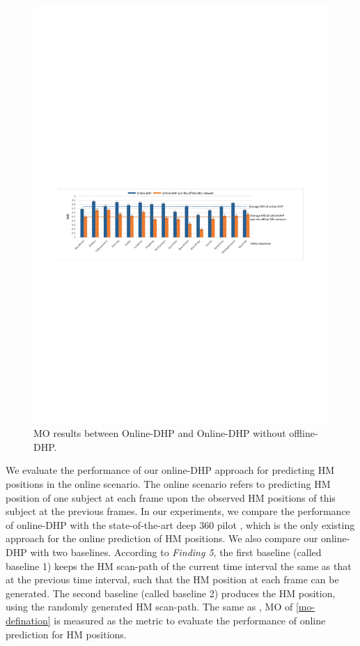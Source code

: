 \documentclass[10pt,journal,compsoc]{IEEEtran}
\begin{document}
\begin{figure}
	\begin{center}
		\centerline{\includegraphics[width=2\columnwidth]{figures/experiment_on_line/Mean_MO}}%
		\caption{\footnotesize{MO results between Online-DHP and Online-DHP without offline-DHP.}}
		\label{Online_compare}
	\end{center}
\end{figure}

We evaluate the performance of our online-DHP approach for predicting HM positions in the online scenario.
The online scenario refers to predicting HM position of one subject at each frame upon the observed HM positions of this subject at the previous frames.
In our experiments, we compare the performance of online-DHP with the state-of-the-art deep 360 pilot \cite{hu2017deep}, which is the only existing approach for the online prediction of HM positions.
We also compare our online-DHP with two baselines. According to \textit{Finding 5}, the first baseline (called baseline 1) keeps the HM scan-path of the current time interval the same as that at the previous time interval, such that the HM position at each frame can be generated.
The second baseline (called baseline 2) produces the HM position, using the randomly generated HM scan-path. The same as \cite{hu2017deep}, MO of \eqref{mo-defination} is measured as the metric to evaluate the performance of online prediction for HM positions.
\end{document}
